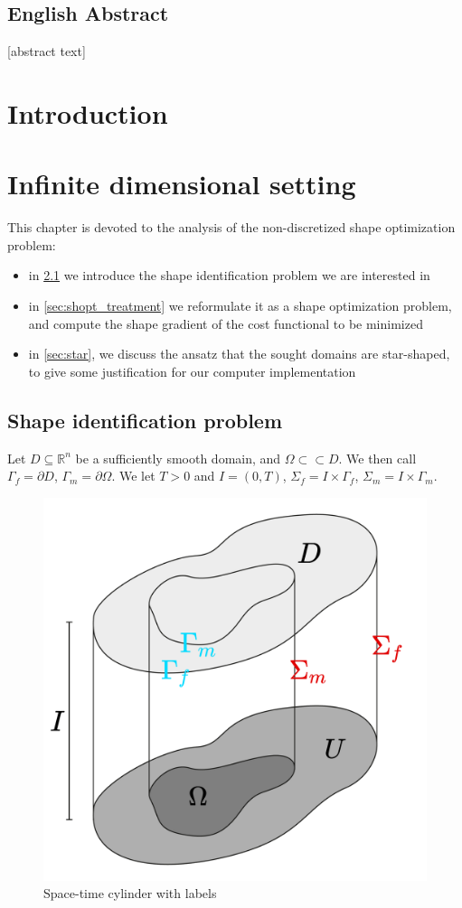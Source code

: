 \documentclass[english,a4paper,9pt,oneside]{scrbook}	%
\theoremstyle{break}
\theoremstyle{remark}
\newcommand{\mR}{\mathbb{R}}
\newcommand{\cc}{\subset\subset}
\begin{document}
\section*{English Abstract}
[abstract text]
\newpage
\tableofcontents  


\chapter{Introduction}  \setcounter{page}{1}   %



\chapter{Infinite dimensional setting}
\label{chap:cts_shape_opt}

This chapter is devoted to the analysis of the non-discretized shape optimization problem:

\begin{itemize}
	\item in \cref{sec:shid} we introduce the shape identification problem we are interested in
	\item in \cref{sec:shopt_treatment} we reformulate it as a shape optimization problem, and compute the shape gradient of the cost functional to be minimized
	\item in \cref{sec:star}, we discuss the ansatz that the sought domains are star-shaped, to give some justification for our computer implementation
\end{itemize}

\section{Shape identification problem}
\label{sec:shid}

Let $D\subseteq\mR^n$ be a sufficiently smooth domain, and $\Omega \cc D$. We then call $\Gamma_f=\partial D$, $\Gamma_m = \partial \Omega$. We let $T>0$ and $I = (0,T)$, $\Sigma_f=I\times \Gamma_f$, $\Sigma_m=I\times \Gamma_m$.

\begin{figure}[H]
\centering
\includegraphics[width=0.25\columnwidth]{Images/Domains.pdf}
\caption{Space-time cylinder with labels}\label{fig:space_time}
\end{figure}
\end{document}

